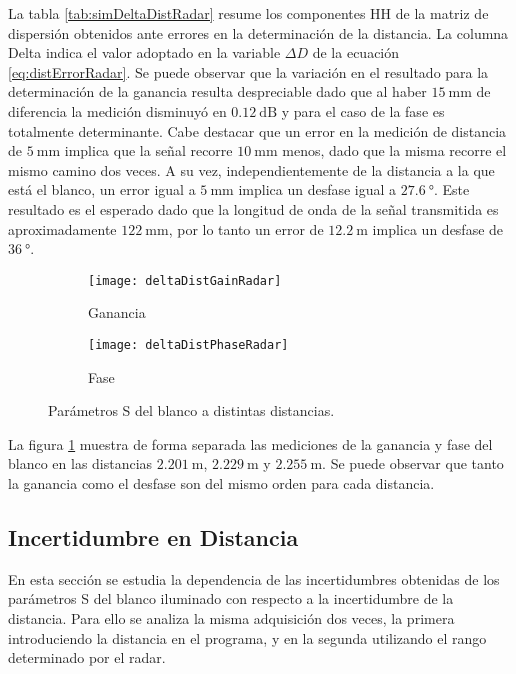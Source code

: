 La tabla \ref{tab:simDeltaDistRadar} resume los componentes HH de la matriz de dispersión obtenidos ante errores en la determinación de la distancia. La columna Delta indica el valor adoptado en la variable $\Delta D$ de la ecuación \ref{eq:distErrorRadar}. Se puede observar que la variación en el resultado para la determinación de la ganancia resulta despreciable dado que al haber $\SI{15}{\milli\meter}$ de diferencia la medición disminuyó en $\SI{0.12}{\dB}$ y para el caso de la fase es totalmente determinante. Cabe destacar que un error en la medición de distancia de $\SI{5}{\milli\meter}$ implica que la señal recorre $\SI{10}{\milli\meter}$ menos, dado que la misma recorre el mismo camino dos veces. A su vez, independientemente de la distancia a la que está el blanco, un error igual a $\SI{5}{\milli\meter}$ implica un desfase igual a $\SI{27.6}{\degree}$. Este resultado es el esperado dado que la longitud de onda de la señal transmitida es aproximadamente $\SI{122}{\milli\meter}$, por lo tanto un error de $\SI{12.2}{\meter}$ implica un desfase de $\SI{36}{\degree}$.

\begin{figure}[H]
  \centering
  \begin{subfigure}{0.49\textwidth}
    \texttt{[image: deltaDistGainRadar]}
    \caption{Ganancia}
  \end{subfigure}
  \begin{subfigure}{0.49\textwidth}
    \texttt{[image: deltaDistPhaseRadar]}
    \caption{Fase}
  \end{subfigure}
  \caption{Parámetros S del blanco a distintas distancias.}
  \label{fig:deltaDistRadar}
\end{figure}
La figura \ref{fig:deltaDistRadar} muestra de forma separada las mediciones de la ganancia y fase del blanco en las distancias $\SI{2.201}{\meter}$, $\SI{2.229}{\meter}$ y $\SI{2.255}{\meter}$. Se puede observar que tanto la ganancia como el desfase son del mismo orden para cada distancia.


\subsection{Incertidumbre en Distancia} \label{ssc:distIncert}

En esta sección se estudia la dependencia de las incertidumbres obtenidas de los parámetros S del blanco iluminado con respecto a la incertidumbre de la distancia. Para ello se analiza la misma adquisición dos veces, la primera introduciendo la distancia en el programa, y en la segunda utilizando el rango determinado por el radar.


